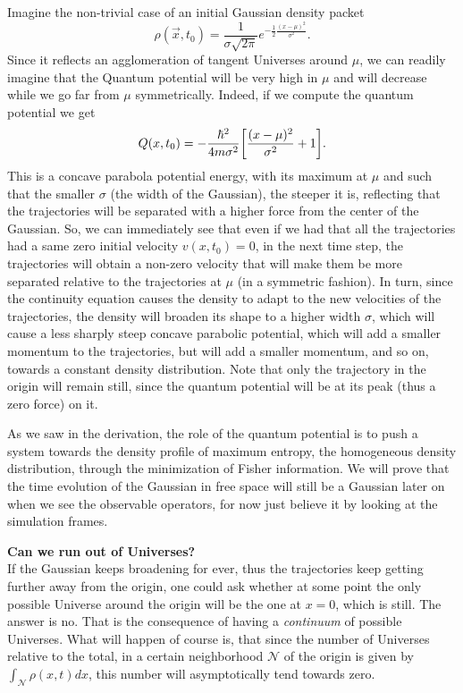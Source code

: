 \documentclass[11pt, a4paper]{article} %
\DeclareRobustCommand{\mybox}[2][gray!10]{%
\begin{tcolorbox}[   %
        left=0.2cm,
        right=0.2cm,
        top=0.15cm,
        bottom=0.15cm,
        colback=#1,
        colframe=#1,
        width=\dimexpr\textwidth\relax, 
        enlarge left by=0mm,
        boxsep=5pt,
        arc=0pt,outer arc=0pt,
        ]
        #2
\end{tcolorbox}
}
\begin{document}
Imagine the non-trivial case of an initial Gaussian density packet 
\begin{equation}
\rho(\vec{x},t_0)=\frac{1}{\sigma\sqrt{2\pi}}e^{-\frac{1}{2}\frac{(x-\mu)^2}{\sigma^2}}.
\end{equation}
Since it reflects an agglomeration of tangent Universes around $\mu$, we can readily imagine that the Quantum potential will be very high in $\mu$ and will decrease while we go far from $\mu$ symmetrically. Indeed, if we compute the quantum potential we get
\begin{equation}
Q(x,t_0)=-\frac{\hbar^2}{4m\sigma^2}\qty[\frac{(x-\mu)^2}{\sigma^2}+1].
\end{equation}
This is a concave parabola potential energy, with its maximum at $\mu$ and such that the smaller $\sigma$ (the width of the Gaussian), the steeper it is, reflecting that the trajectories will be separated with a higher force from the center of the Gaussian. So, we can immediately see that even if we had that all the trajectories had a same zero initial velocity $v(x,t_0)=0$, in the next time step, the trajectories will obtain a non-zero velocity that will make them be more separated relative to the trajectories at $\mu$ (in a symmetric fashion). In turn, since the continuity equation causes the density to adapt to the new velocities of the trajectories, the density will broaden its shape to a higher width $\sigma$, which will cause a less sharply steep concave parabolic potential, which will add a smaller momentum to the trajectories, but will add a smaller momentum, and so on, towards a constant density distribution. Note that only the trajectory in the origin will remain still, since the quantum potential will be at its peak (thus a zero force) on it.

As we saw in the derivation, the role of the quantum potential is to push a system towards the density profile of maximum entropy, the homogeneous density distribution, through the minimization of Fisher information. We will prove that the time evolution of the Gaussian in free space will still be a Gaussian later on when we see the observable operators, for now just believe it by looking at the simulation frames. 

\mybox{
{\bf Can we run out of Universes?}\\
If the Gaussian keeps broadening for ever, thus the trajectories keep getting further away from the origin, one could ask whether at some point the only possible Universe around the origin will be the one at $x=0$, which is still. The answer is no. That is the consequence of having a {\em continuum} of possible Universes. What will happen of course is, that since the number of Universes relative to the total, in a certain neighborhood $\mathcal{N}$ of the origin is given by $\int_\mathcal{N}\rho(x,t)dx$, this number will asymptotically tend towards zero.
}
\end{document}

